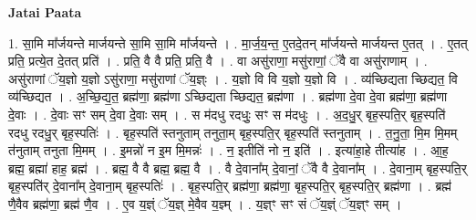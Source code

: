 \documentclass[17pt]{extarticle}
\begin{document}
\textbf{Jatai Paata} \newline

1. सा॒मि मा᳚र्जयन्ते मार्जयन्ते सा॒मि सा॒मि मा᳚र्जयन्ते । . मा॒र्ज॒य॒न्त॒ ए॒तदे॒तन् मा᳚र्जयन्ते मार्जयन्त ए॒तत् । . ए॒तत् प्रति॒ प्रत्ये॒त दे॒तत् प्रति॑ । . प्रति॒ वै वै प्रति॒ प्रति॒ वै । . वा असु॑राणा॒ मसु॑राणां॒ ॅवै वा असु॑राणाम् । . असु॑राणां ॅय॒ज्ञो य॒ज्ञो ऽसु॑राणा॒ मसु॑राणां ॅय॒ज्ञ्ः । . य॒ज्ञो वि वि य॒ज्ञो य॒ज्ञो वि । . व्य॑च्छिद्यता च्छिद्यत॒ वि व्य॑च्छिद्यत । . अ॒च्छि॒द्य॒त॒ ब्रह्म॑णा॒ ब्रह्म॑णा ऽच्छिद्यता च्छिद्यत॒ ब्रह्म॑णा । . ब्रह्म॑णा दे॒वा दे॒वा ब्रह्म॑णा॒ ब्रह्म॑णा दे॒वाः । . दे॒वाः सꣳ सम् दे॒वा दे॒वाः सम् । . स म॑दधु रदधुः॒ सꣳ स म॑दधुः । . अ॒द॒धु॒र् बृह॒स्पति॒र् बृह॒स्पति॑ रदधु रदधु॒र् बृह॒स्पतिः॑ । . बृह॒स्पति॑ स्तनुताम् तनुता॒म् बृह॒स्पति॒र् बृह॒स्पति॑ स्तनुताम् । . त॒नु॒ता॒ मि॒म मि॒मम् त॑नुताम् तनुता मि॒मम् । . इ॒मन्नो॑ न इ॒म मि॒मन्नः॑ । . न॒ इतीति॑ नो न॒ इति॑ । . इत्या॑हा॒हे तीत्या॑ह । . आ॒ह॒ ब्रह्म॒ ब्रह्मा॑ हाह॒ ब्रह्म॑ । . ब्रह्म॒ वै वै ब्रह्म॒ ब्रह्म॒ वै । . वै दे॒वाना᳚म् दे॒वानां॒ ॅवै वै दे॒वाना᳚म् । . दे॒वाना॒म् बृह॒स्पति॒र् बृह॒स्पति॑र् दे॒वाना᳚म् दे॒वाना॒म् बृह॒स्पतिः॑ । . बृह॒स्पति॒र् ब्रह्म॑णा॒ ब्रह्म॑णा॒ बृह॒स्पति॒र् बृह॒स्पति॒र् ब्रह्म॑णा । . ब्रह्म॑ णै॒वैव ब्रह्म॑णा॒ ब्रह्म॑ णै॒व । . ए॒व य॒ज्ञ्ं ॅय॒ज्ञ् मे॒वैव य॒ज्ञ्म् । . य॒ज्ञ्ꣳ सꣳ सं ॅय॒ज्ञ्ं ॅय॒ज्ञ्ꣳ सम् । \newline
\end{document}
